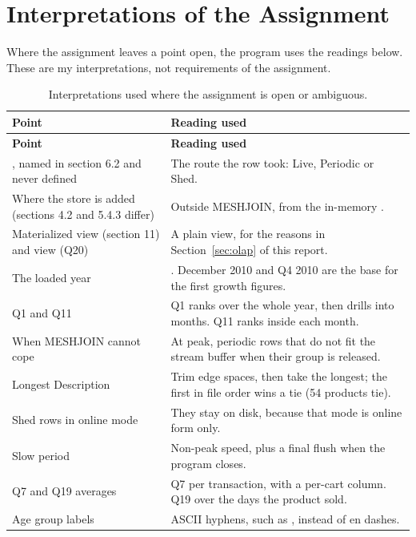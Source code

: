 \documentclass[11pt,a4paper]{article}
\newcommand{\code}[1]{\texttt{\detokenize{#1}}}
\begin{document}
\section{Interpretations of the Assignment}

Where the assignment leaves a point open, the program uses the readings below. These are my interpretations, not requirements of the assignment.

\begin{longtable}{@{}>{\raggedright\arraybackslash}p{5.6cm}>{\raggedright\arraybackslash}p{9.2cm}@{}}
\caption{Interpretations used where the assignment is open or ambiguous.}\\
\toprule \textbf{Point} & \textbf{Reading used} \\ \midrule \endfirsthead
\toprule \textbf{Point} & \textbf{Reading used} \\ \midrule \endhead
\bottomrule \endfoot
    \code{processing_mode}, named in section 6.2 and never defined & The route the row took: Live, Periodic or Shed. \\
    Where the store is added (sections 4.2 and 5.4.3 differ) & Outside MESHJOIN, from the in-memory \code{Store_list}. \\
    Materialized view (section 11) and view (Q20) & A plain view, for the reasons in Section~\ref{sec:olap} of this report. \\
    The loaded year & 2011. December 2010 and Q4 2010 are the base for the first growth figures. \\
    Q1 and Q11 & Q1 ranks over the whole year, then drills into months. Q11 ranks inside each month. \\
    When MESHJOIN cannot cope & At peak, periodic rows that do not fit the stream buffer when their group is released. \\
    Longest Description & Trim edge spaces, then take the longest; the first in file order wins a tie (54 products tie). \\
    Shed rows in online mode & They stay on disk, because that mode is online form only. \\
    Slow period & Non-peak speed, plus a final flush when the program closes. \\
    Q7 and Q19 averages & Q7 per transaction, with a per-cart column. Q19 over the days the product sold. \\
    Age group labels & ASCII hyphens, such as \code{0-17}, instead of en dashes. \\
\end{longtable}
\end{document}
